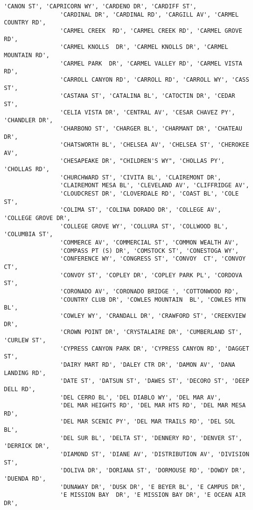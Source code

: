 \documentclass[11pt]{article}
\begin{document}
\begin{Verbatim}[commandchars=\\\{\}]
                'CANON ST', 'CAPRICORN WY', 'CARDENO DR', 'CARDIFF ST',
                'CARDINAL DR', 'CARDINAL RD', 'CARGILL AV', 'CARMEL COUNTRY RD',
                'CARMEL CREEK  RD', 'CARMEL CREEK RD', 'CARMEL GROVE RD',
                'CARMEL KNOLLS  DR', 'CARMEL KNOLLS DR', 'CARMEL MOUNTAIN RD',
                'CARMEL PARK  DR', 'CARMEL VALLEY RD', 'CARMEL VISTA RD',
                'CARROLL CANYON RD', 'CARROLL RD', 'CARROLL WY', 'CASS ST',
                'CASTANA ST', 'CATALINA BL', 'CATOCTIN DR', 'CEDAR ST',
                'CELIA VISTA DR', 'CENTRAL AV', 'CESAR CHAVEZ PY', 'CHANDLER DR',
                'CHARBONO ST', 'CHARGER BL', 'CHARMANT DR', 'CHATEAU DR',
                'CHATSWORTH BL', 'CHELSEA AV', 'CHELSEA ST', 'CHEROKEE AV',
                'CHESAPEAKE DR', "CHILDREN'S WY", 'CHOLLAS PY', 'CHOLLAS RD',
                'CHURCHWARD ST', 'CIVITA BL', 'CLAIREMONT DR',
                'CLAIREMONT MESA BL', 'CLEVELAND AV', 'CLIFFRIDGE AV',
                'CLOUDCREST DR', 'CLOVERDALE RD', 'COAST BL', 'COLE ST',
                'COLIMA ST', 'COLINA DORADO DR', 'COLLEGE AV', 'COLLEGE GROVE DR',
                'COLLEGE GROVE WY', 'COLLURA ST', 'COLLWOOD BL', 'COLUMBIA ST',
                'COMMERCE AV', 'COMMERCIAL ST', 'COMMON WEALTH AV',
                'COMPASS PT (S) DR', 'COMSTOCK ST', 'CONESTOGA WY',
                'CONFERENCE WY', 'CONGRESS ST', 'CONVOY  CT', 'CONVOY CT',
                'CONVOY ST', 'COPLEY DR', 'COPLEY PARK PL', 'CORDOVA ST',
                'CORONADO AV', 'CORONADO BRIDGE ', 'COTTONWOOD RD',
                'COUNTRY CLUB DR', 'COWLES MOUNTAIN  BL', 'COWLES MTN BL',
                'COWLEY WY', 'CRANDALL DR', 'CRAWFORD ST', 'CREEKVIEW DR',
                'CROWN POINT DR', 'CRYSTALAIRE DR', 'CUMBERLAND ST', 'CURLEW ST',
                'CYPRESS CANYON PARK DR', 'CYPRESS CANYON RD', 'DAGGET ST',
                'DAIRY MART RD', 'DALEY CTR DR', 'DAMON AV', 'DANA LANDING RD',
                'DATE ST', 'DATSUN ST', 'DAWES ST', 'DECORO ST', 'DEEP DELL RD',
                'DEL CERRO BL', 'DEL DIABLO WY', 'DEL MAR AV',
                'DEL MAR HEIGHTS RD', 'DEL MAR HTS RD', 'DEL MAR MESA RD',
                'DEL MAR SCENIC PY', 'DEL MAR TRAILS RD', 'DEL SOL BL',
                'DEL SUR BL', 'DELTA ST', 'DENNERY RD', 'DENVER ST', 'DERRICK DR',
                'DIAMOND ST', 'DIANE AV', 'DISTRIBUTION AV', 'DIVISION ST',
                'DOLIVA DR', 'DORIANA ST', 'DORMOUSE RD', 'DOWDY DR', 'DUENDA RD',
                'DUNAWAY DR', 'DUSK DR', 'E BEYER BL', 'E CAMPUS DR',
                'E MISSION BAY  DR', 'E MISSION BAY DR', 'E OCEAN AIR  DR',

\end{Verbatim}
\end{document}
